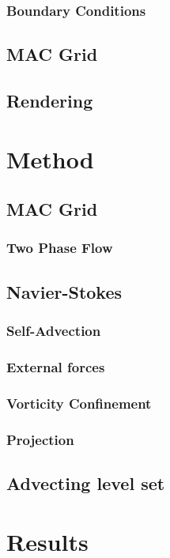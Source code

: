 \documentclass[]{report}   %
\begin{document}
\subsection{Boundary Conditions}

\section{MAC Grid}

\section{Rendering}


\chapter{Method}
\section{MAC Grid}

\subsection{Two Phase Flow}

\section{Navier-Stokes}
\subsection{Self-Advection}

\subsection{External forces}

\subsection{Vorticity Confinement}

\subsection{Projection}

\section{Advecting level set}


\chapter{Results}



\endgroup



\end{document}
